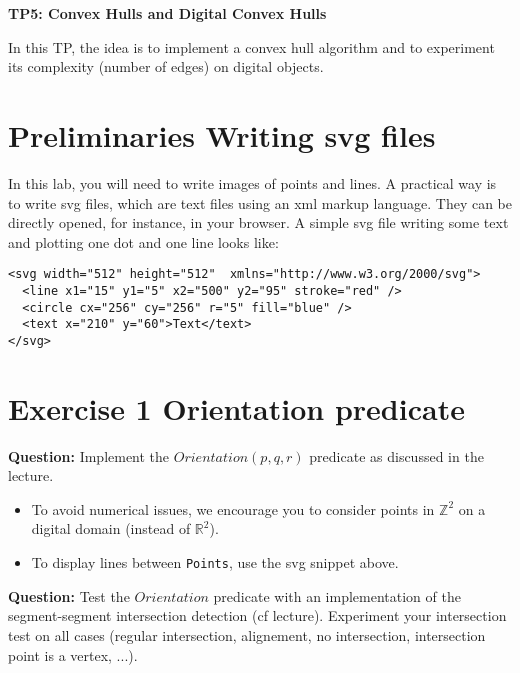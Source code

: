 \documentclass[a4paper, 11pt]{article}
\title{}
\author{}
\date{}
\begin{document}
\begin{center}
	\LARGE \textbf{TP5: Convex Hulls and Digital Convex Hulls}
\end{center}

\bigskip
\par In this TP, the idea is to implement a convex hull algorithm and to experiment its complexity (number of edges) on digital objects.


\section*{Preliminaries \rm Writing svg files}

In this lab, you will need to write images of points and lines. A practical way is to write svg files, which are text files using an xml markup language. They can be directly opened, for instance, in your browser. A simple svg file writing some text and plotting one dot and one line looks like:

\begin{verbatim} 
<svg width="512" height="512"  xmlns="http://www.w3.org/2000/svg">
  <line x1="15" y1="5" x2="500" y2="95" stroke="red" />
  <circle cx="256" cy="256" r="5" fill="blue" />
  <text x="210" y="60">Text</text>
</svg>
\end{verbatim} 
\section*{Exercise 1 \rm Orientation predicate}

{\bf Question:} Implement the $Orientation(p,q,r)$ predicate as discussed in the lecture.
	\begin{itemize}
	\item To avoid numerical issues, we encourage you to consider points in $\mathbb{Z}^2$ on a digital domain (instead of $\mathbb{R}^2$). 
	\item To display lines between \texttt{Points}, use the svg snippet above.
	\end{itemize}

{\bf Question:} Test the $Orientation$ predicate with an implementation of the segment-segment intersection detection (cf lecture). Experiment your intersection test on all cases (regular intersection, alignement, no intersection, intersection point is a vertex, ...).


\bigskip
\bigskip
\bigskip
\end{document}
